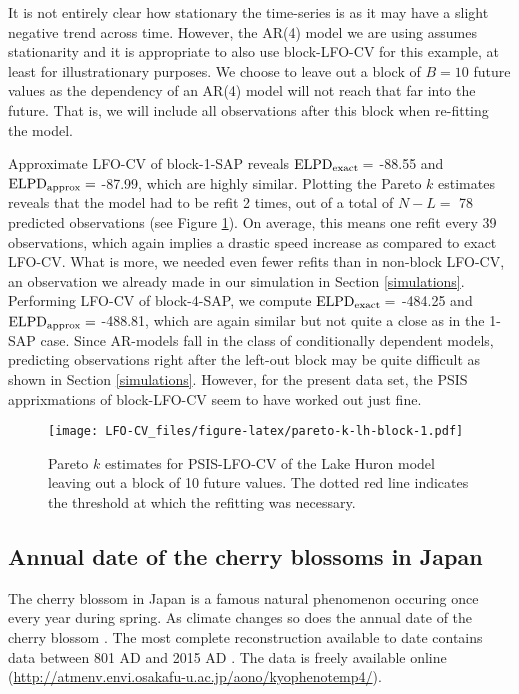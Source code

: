 \documentclass[american,]{article}
\begin{document}
It is not entirely clear how stationary the time-series is as it may have a
slight negative trend across time. However, the AR(4) model we are using assumes
stationarity and it is appropriate to also use block-LFO-CV for this example, at
least for illustrationary purposes. We choose to leave out a block of \(B = 10\)
future values as the dependency of an AR(4) model will not reach that far into
the future. That is, we will include all observations after this block when
re-fitting the model.

Approximate LFO-CV of block-1-SAP reveals
\({\rm ELPD}_{\rm exact} =\) -88.55 and
\({\rm ELPD}_{\rm approx} =\) -87.99,
which are highly similar. Plotting the Pareto \(k\) estimates reveals that the
model had to be refit 2 times, out of a total of \(N - L =\)
78 predicted observations (see Figure \ref{fig:pareto-k-lh-block}). On average,
this means one refit every 39 observations, which
again implies a drastic speed increase as compared to exact LFO-CV. What is more,
we needed even fewer refits than in non-block LFO-CV, an observation we already
made in our simulation in Section \ref{simulations}.
Performing LFO-CV of block-4-SAP, we compute
\({\rm ELPD}_{\rm exact} =\) -484.25 and
\({\rm ELPD}_{\rm approx} =\) -488.81,
which are again similar but not quite a close as in the 1-SAP case.
Since AR-models fall in the class of conditionally dependent models, predicting
observations right after the left-out block may be quite difficult as shown
in Section \ref{simulations}. However, for the present data set, the
PSIS apprixmations of block-LFO-CV seem to have worked out just fine.

\begin{figure}
\centering
\texttt{[image: LFO-CV\_files/figure-latex/pareto-k-lh-block-1.pdf]}
\caption{\label{fig:pareto-k-lh-block}Pareto \(k\) estimates for PSIS-LFO-CV of the Lake Huron model leaving out a block of 10 future values. The dotted red line indicates the threshold at which the refitting was necessary.}
\end{figure}

\hypertarget{annual-date-of-the-cherry-blossoms-in-japan}{%
\subsection{Annual date of the cherry blossoms in Japan}\label{annual-date-of-the-cherry-blossoms-in-japan}}

The cherry blossom in Japan is a famous natural phenomenon occuring once every
year during spring. As climate changes so does the annual date of the cherry
blossom \citep{aono2008, aono2010}. The most complete reconstruction available to
date contains data between 801 AD and 2015 AD
\citep{aono2008, aono2010}. The data is freely available online
(\url{http://atmenv.envi.osakafu-u.ac.jp/aono/kyophenotemp4/}).
\end{document}
